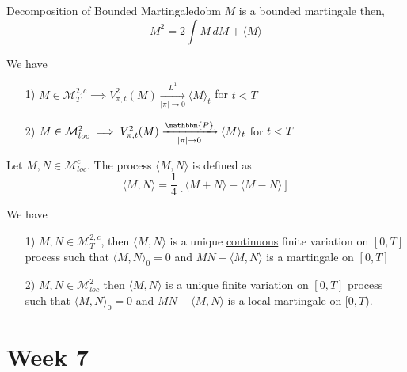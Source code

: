 \documentclass[12pt,a4paper]{article}
\begin{document}
\begin{remark}{Decomposition of Bounded Martingale}{dobm}
    $M$ is a bounded martingale then,
    $$
    M^2 = 2\int M\, dM + \langle M\rangle
    $$
\end{remark}
\begin{theorem}{}{}
    We have
    \begin{enumerate}
        \item[1)] $M\in\mathcal{M}_T^{2,c}\implies V_{\pi,t}^2(M)\xrightarrow[|\pi|\to 0]{L^1}\langle M\rangle_t$ for $t<T$
        \item[2)] $M\in\mathcal{M}^2_{loc}\implies V_{\pi,t}^2(M)\xrightarrow[|\pi|\to 0]{\mathbbm{P}}\langle M\rangle_t$ for $t<T$
    \end{enumerate}
\end{theorem}
\begin{definition}{}{}
    Let $M,N\in\mathcal{M}_{loc}^c$. The process $\langle M,N\rangle$ is defined as 
    $$
    \langle M,N\rangle = \frac{1}{4}\left[\langle M+N\rangle -\langle M-N\rangle\right]
    $$
\end{definition}
\begin{proposition}{}{}
    We have
    \begin{enumerate}
        \item[1)] $M,N\in\mathcal{M}^{2,c}_T$, then $\langle M, N\rangle$ is a unique \underline{continuous} finite variation on $[0,T]$ process such that $\langle M, N\rangle_0=0$ and 
        $MN-\langle M, N \rangle$ is a martingale on $[0,T]$
        \item[2)] $M,N\in\mathcal{M}^2_{loc}$ then $\langle M, N\rangle$ is a unique finite variation on $[0,T]$ process such that $\langle M, N\rangle_0=0$ and $MN-\langle M,N\rangle$ is a \underline{local martingale} on $[0,T)$.
    \end{enumerate}
\end{proposition}
\pagebreak
\section{Week 7}
\end{document}
